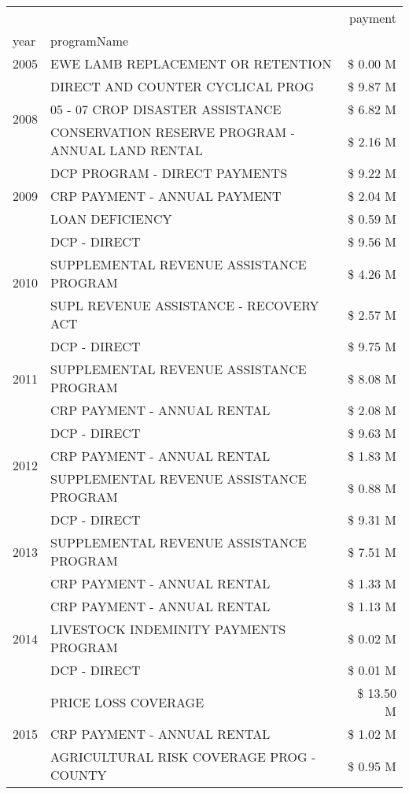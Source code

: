 \begin{tabular}{llr}
\toprule
 &  & payment \\
year & programName &  \\
\midrule
2005 & EWE LAMB REPLACEMENT OR RETENTION & \$ 0.00 M \\
\cline{1-3}
\multirow[t]{3}{*}{2008} & DIRECT AND COUNTER CYCLICAL PROG & \$ 9.87 M \\
 & 05 - 07 CROP DISASTER ASSISTANCE & \$ 6.82 M \\
 & CONSERVATION RESERVE PROGRAM - ANNUAL LAND RENTAL & \$ 2.16 M \\
\cline{1-3}
\multirow[t]{3}{*}{2009} & DCP PROGRAM - DIRECT PAYMENTS & \$ 9.22 M \\
 & CRP PAYMENT - ANNUAL PAYMENT & \$ 2.04 M \\
 & LOAN DEFICIENCY & \$ 0.59 M \\
\cline{1-3}
\multirow[t]{3}{*}{2010} & DCP - DIRECT & \$ 9.56 M \\
 & SUPPLEMENTAL REVENUE ASSISTANCE PROGRAM & \$ 4.26 M \\
 & SUPL REVENUE ASSISTANCE - RECOVERY ACT & \$ 2.57 M \\
\cline{1-3}
\multirow[t]{3}{*}{2011} & DCP - DIRECT & \$ 9.75 M \\
 & SUPPLEMENTAL REVENUE ASSISTANCE PROGRAM & \$ 8.08 M \\
 & CRP PAYMENT - ANNUAL RENTAL & \$ 2.08 M \\
\cline{1-3}
\multirow[t]{3}{*}{2012} & DCP - DIRECT & \$ 9.63 M \\
 & CRP PAYMENT - ANNUAL RENTAL & \$ 1.83 M \\
 & SUPPLEMENTAL REVENUE ASSISTANCE PROGRAM & \$ 0.88 M \\
\cline{1-3}
\multirow[t]{3}{*}{2013} & DCP - DIRECT & \$ 9.31 M \\
 & SUPPLEMENTAL REVENUE ASSISTANCE PROGRAM & \$ 7.51 M \\
 & CRP PAYMENT - ANNUAL RENTAL & \$ 1.33 M \\
\cline{1-3}
\multirow[t]{3}{*}{2014} & CRP PAYMENT - ANNUAL RENTAL & \$ 1.13 M \\
 & LIVESTOCK INDEMINITY PAYMENTS PROGRAM & \$ 0.02 M \\
 & DCP - DIRECT & \$ 0.01 M \\
\cline{1-3}
\multirow[t]{3}{*}{2015} & PRICE LOSS COVERAGE & \$ 13.50 M \\
 & CRP PAYMENT - ANNUAL RENTAL & \$ 1.02 M \\
 & AGRICULTURAL RISK COVERAGE PROG - COUNTY & \$ 0.95 M \\

\end{tabular}
